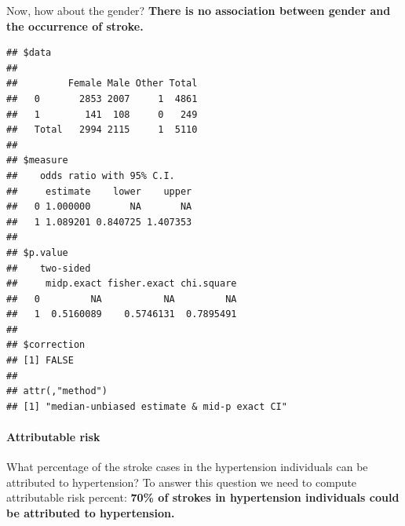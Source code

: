\documentclass[
]{article}
\newenvironment{Shaded}{\begin{snugshade}}{\end{snugshade}}
\newcommand{\FunctionTok}[1]{\textcolor[rgb]{0.13,0.29,0.53}{\textbf{#1}}}
\newcommand{\NormalTok}[1]{#1}
\newcommand{\OtherTok}[1]{\textcolor[rgb]{0.56,0.35,0.01}{#1}}
\newcommand{\SpecialCharTok}[1]{\textcolor[rgb]{0.81,0.36,0.00}{\textbf{#1}}}
\begin{document}
Now, how about the gender? \textbf{There is no association between
gender and the occurrence of stroke.}

\begin{Shaded}
\end{Shaded}

\begin{verbatim}
## $data
##        
##         Female Male Other Total
##   0       2853 2007     1  4861
##   1        141  108     0   249
##   Total   2994 2115     1  5110
## 
## $measure
##    odds ratio with 95% C.I.
##     estimate    lower    upper
##   0 1.000000       NA       NA
##   1 1.089201 0.840725 1.407353
## 
## $p.value
##    two-sided
##     midp.exact fisher.exact chi.square
##   0         NA           NA         NA
##   1  0.5160089    0.5746131  0.7895491
## 
## $correction
## [1] FALSE
## 
## attr(,"method")
## [1] "median-unbiased estimate & mid-p exact CI"
\end{verbatim}

\paragraph{\texorpdfstring{\textbf{Attributable
risk}}{Attributable risk}}\label{attributable-risk}

What percentage of the stroke cases in the hypertension individuals can
be attributed to hypertension? To answer this question we need to
compute attributable risk percent: \textbf{70\% of strokes in
hypertension individuals could be attributed to hypertension.}
\end{document}
